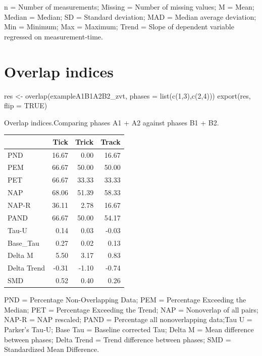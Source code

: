 \documentclass[
]{book}
\newenvironment{Shaded}{\begin{snugshade}}{\end{snugshade}}
\newcommand{\AttributeTok}[1]{\textcolor[rgb]{0.77,0.63,0.00}{#1}}
\newcommand{\ConstantTok}[1]{\textcolor[rgb]{0.00,0.00,0.00}{#1}}
\newcommand{\DecValTok}[1]{\textcolor[rgb]{0.00,0.00,0.81}{#1}}
\newcommand{\FunctionTok}[1]{\textcolor[rgb]{0.00,0.00,0.00}{#1}}
\newcommand{\NormalTok}[1]{#1}
\newcommand{\OtherTok}[1]{\textcolor[rgb]{0.56,0.35,0.01}{#1}}
\begin{document}
n = Number of measurements; Missing = Number of missing values; M = Mean; Median = Median; SD = Standard deviation; MAD = Median average deviation; Min = Minimum; Max = Maximum; Trend = Slope of dependent variable regressed on measurement-time.

\hypertarget{overlap-indices}{%
\section{Overlap indices}\label{overlap-indices}}

\begin{Shaded}
\begin{Highlighting}[]
\NormalTok{res }\OtherTok{\textless{}{-}} \FunctionTok{overlap}\NormalTok{(exampleA1B1A2B2\_zvt, }\AttributeTok{phases =} \FunctionTok{list}\NormalTok{(}\FunctionTok{c}\NormalTok{(}\DecValTok{1}\NormalTok{,}\DecValTok{3}\NormalTok{),}\FunctionTok{c}\NormalTok{(}\DecValTok{2}\NormalTok{,}\DecValTok{4}\NormalTok{)))}
\FunctionTok{export}\NormalTok{(res, }\AttributeTok{flip =} \ConstantTok{TRUE}\NormalTok{)}
\end{Highlighting}
\end{Shaded}

Overlap indices.Comparing phases A1 + A2 against phases B1 + B2.

\begin{table}
\centering
\begin{tabular}{lrrr}
\toprule
  & Tick & Trick & Track\\
\midrule
PND & 16.67 & 0.00 & 16.67\\
PEM & 66.67 & 50.00 & 50.00\\
PET & 66.67 & 33.33 & 33.33\\
NAP & 68.06 & 51.39 & 58.33\\
NAP-R & 36.11 & 2.78 & 16.67\\
\addlinespace
PAND & 66.67 & 50.00 & 54.17\\
Tau-U & 0.14 & 0.03 & -0.03\\
Base\_Tau & 0.27 & 0.02 & 0.13\\
Delta M & 5.50 & 3.17 & 0.83\\
Delta Trend & -0.31 & -1.10 & -0.74\\
\addlinespace
SMD & 0.52 & 0.40 & 0.26\\
\bottomrule
\end{tabular}
\end{table}

PND = Percentage Non-Overlapping Data; PEM = Percentage Exceeding the Median; PET = Percentage Exceeding the Trend; NAP = Nonoverlap of all pairs; NAP-R = NAP rescaled;
PAND = Percentage all nonoverlapping data;Tau U = Parker's Tau-U; Base Tau = Baseline corrected Tau; Delta M = Mean difference between phases; Delta Trend = Trend difference between phases; SMD = Standardized Mean Difference.
\end{document}
